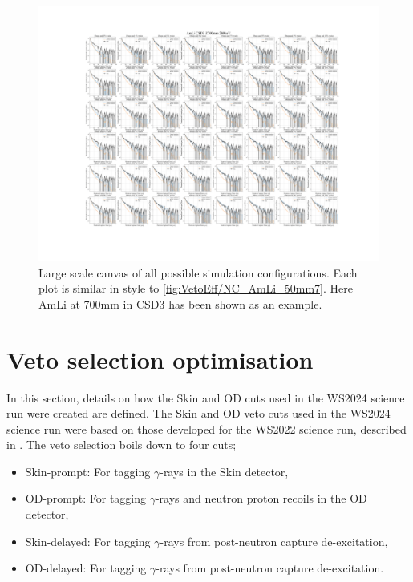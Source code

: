 \begin{figure}[!ht]
	\centering
	\includegraphics[width=\linewidth]{figures/VetoEfficiency/AmLi_CSD3_Z700mm_200keV.png}
	\caption{Large scale canvas of all possible simulation configurations. Each plot is similar in style to \autoref{fig:VetoEff/NC_AmLi_50mm7}. Here AmLi at 700mm in CSD3 has been shown as an example.}
	\label{fig:VetoEff/NC_Canvas}
\end{figure}


\section{Veto selection optimisation}\label{sec:VetoEff/VetoSelectionOptimisation}
In this section, details on how the Skin and OD cuts used in the WS2024 science run were created are defined. The Skin and OD veto cuts used in the WS2024 science run were based on those developed for the WS2022 science run, described in \cite{LZCollaboration:2024lux}.
The veto selection boils down to four cuts;
\begin{itemize}
	\item Skin-prompt: For tagging $\gamma$-rays in the Skin detector,
	\item OD-prompt: For tagging $\gamma$-rays and neutron proton recoils in the OD detector,
	\item Skin-delayed: For tagging $\gamma$-rays from post-neutron capture de-excitation,
	\item OD-delayed: For tagging $\gamma$-rays from post-neutron capture de-excitation.
\end{itemize}


